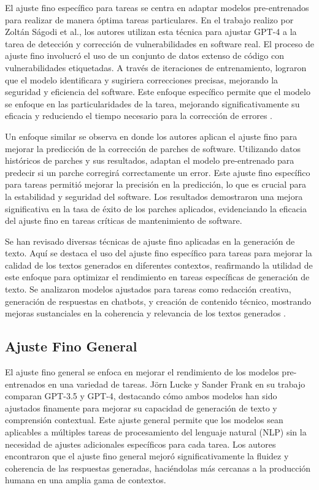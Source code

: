 El ajuste fino específico para tareas se centra en adaptar modelos pre-entrenados para realizar de manera óptima tareas particulares. En el trabajo realizo por Zoltán Ságodi et al., los autores utilizan esta técnica para ajustar GPT-4 a la tarea de detección y corrección de vulnerabilidades en software real. El proceso de ajuste fino involucró el uso de un conjunto de datos extenso de código con vulnerabilidades etiquetadas. A través de iteraciones de entrenamiento, lograron que el modelo identificara y sugiriera correcciones precisas, mejorando la seguridad y eficiencia del software. Este enfoque específico permite que el modelo se enfoque en las particularidades de la tarea, mejorando significativamente su eficacia y reduciendo el tiempo necesario para la corrección de errores \cite{Sagodi2024}.

Un enfoque similar se observa en \cite{Zhang2024} donde los autores aplican el ajuste fino para mejorar la predicción de la corrección de parches de software. Utilizando datos históricos de parches y sus resultados, adaptan el modelo pre-entrenado para predecir si un parche corregirá correctamente un error. Este ajuste fino específico para tareas permitió mejorar la precisión en la predicción, lo que es crucial para la estabilidad y seguridad del software. Los resultados demostraron una mejora significativa en la tasa de éxito de los parches aplicados, evidenciando la eficacia del ajuste fino en tareas críticas de mantenimiento de software.

Se han revisado diversas técnicas de ajuste fino aplicadas en la generación de texto. Aquí se destaca el uso del ajuste fino específico para tareas para mejorar la calidad de los textos generados en diferentes contextos, reafirmando la utilidad de este enfoque para optimizar el rendimiento en tareas específicas de generación de texto. Se analizaron modelos ajustados para tareas como redacción creativa, generación de respuestas en chatbots, y creación de contenido técnico, mostrando mejoras sustanciales en la coherencia y relevancia de los textos generados \cite{JunyiLi2024}.

\subsection{Ajuste Fino General}

El ajuste fino general se enfoca en mejorar el rendimiento de los modelos pre-entrenados en una variedad de tareas. Jörn Lucke y Sander Frank en su trabajo \cite{Lucke2024} comparan GPT-3.5 y GPT-4, destacando cómo ambos modelos han sido ajustados finamente para mejorar su capacidad de generación de texto y comprensión contextual. Este ajuste general permite que los modelos sean aplicables a múltiples tareas de procesamiento del lenguaje natural (NLP) sin la necesidad de ajustes adicionales específicos para cada tarea. Los autores encontraron que el ajuste fino general mejoró significativamente la fluidez y coherencia de las respuestas generadas, haciéndolas más cercanas a la producción humana en una amplia gama de contextos.

